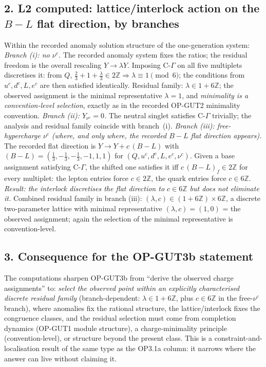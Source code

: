 \subsection*{2. L2 computed: lattice/interlock action on the
$B{-}L$ flat direction, by branches}
Within the recorded anomaly solution structure of the
one-generation system:
\emph{Branch (i): no $\nu^c$.}
The recorded anomaly system fixes the ratios; the residual
freedom is the overall rescaling $Y\to\lambda Y$.
Imposing C-$\Gamma$ on all five multiplets discretises it:
from $Q$, $\tfrac23+1+\tfrac\lambda3\in2\mathbb Z\Rightarrow
\lambda\equiv1\pmod 6$; the conditions from $u^c,d^c,L,e^c$ are
then satisfied identically.
Residual family: $\lambda\in1+6\mathbb Z$; the observed
assignment is the minimal representative $\lambda=1$, and
\emph{minimality is a convention-level selection}, exactly as in
the recorded OP-GUT2 minimality convention.
\emph{Branch (ii): $Y_{\nu^c}=0$.}
The neutral singlet satisfies C-$\Gamma$ trivially; the analysis
and residual family coincide with branch~(i).
\emph{Branch (iii): free-hypercharge $\nu^c$ (where, and only
where, the recorded $B{-}L$ flat direction appears).}
The recorded flat direction is $Y\to Y+c\,(B{-}L)$ with
$(B{-}L)=(\tfrac13,-\tfrac13,-\tfrac13,-1,1,1)$ for
$(Q,u^c,d^c,L,e^c,\nu^c)$.
Given a base assignment satisfying C-$\Gamma$, the shifted one
satisfies it iff $c\,(B{-}L)_f\in2\mathbb Z$ for every multiplet:
the lepton entries force $c\in2\mathbb Z$, the quark entries
force $c\in6\mathbb Z$.
\emph{Result: the interlock discretises the flat direction to
$c\in6\mathbb Z$ but does not eliminate it.}
Combined residual family in branch (iii):
$(\lambda,c)\in(1+6\mathbb Z)\times6\mathbb Z$, a discrete
two-parameter lattice with minimal representative
$(\lambda,c)=(1,0)$ = the observed assignment; again the
selection of the minimal representative is convention-level.

\subsection*{3. Consequence for the OP-GUT3b statement}
The computations sharpen OP-GUT3b from ``derive the observed
charge assignments'' to: \emph{select the observed point within
an explicitly characterised discrete residual family}
(branch-dependent: $\lambda\in1+6\mathbb Z$, plus $c\in6\mathbb Z$
in the free-$\nu^c$ branch), where anomalies fix the rational
structure, the lattice/interlock fixes the congruence classes,
and the residual selection must come from completion dynamics
(OP-GUT1 module structure), a charge-minimality principle
(convention-level), or structure beyond the present class.
This is a constraint-and-localisation result of the same type as
the OP3.1a column: it narrows where the answer can live without
claiming it.

